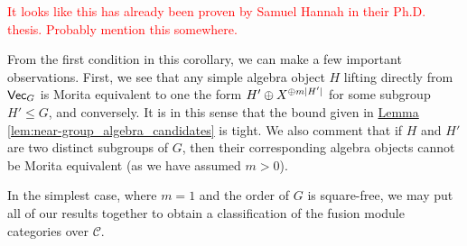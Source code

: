 \documentclass[12pt, reqno]{amsart}
\numberwithin{equation}{section}
\theoremstyle{plainspace}
\theoremstyle{definitionspace}
\theoremstyle{remarkspace}
\newtheorem{remark}[theorem]{Remark}
\DeclarePairedDelimiter{\abs}{\lvert}{\rvert}
\newcommand{\mathcat}[1]{\mathcal{#1}}
\newcommand{\textcat}[1]{\textup{\textsf{#1}}}
\begin{document}
\noindent \textcolor{red}{It looks like this has already been proven by Samuel Hannah in their Ph.D. thesis. Probably mention this somewhere.}
\newline

\noindent From the first condition in this corollary, we can make a few important observations. First, we see that any simple algebra object $H$ lifting directly from $\textcat{Vec}_G$ is Morita equivalent to one the form $H' \oplus X^{\oplus m\abs{H'}}$ for some subgroup $H' \leq G$, and conversely. It is in this sense that the bound given in \hyperref[lem:near-group_algebra_candidates]{Lemma \ref*{lem:near-group_algebra_candidates}} is tight. We also comment that if $H$ and $H'$ are two distinct subgroups of $G$, then their corresponding algebra objects cannot be Morita equivalent (as we have assumed $m > 0$).
\newline

\noindent In the simplest case, where $m = 1$ and the order of $G$ is square-free, we may put all of our results together to obtain a classification of the fusion module categories over $\mathcat{C}$.
\newline

\end{document}
